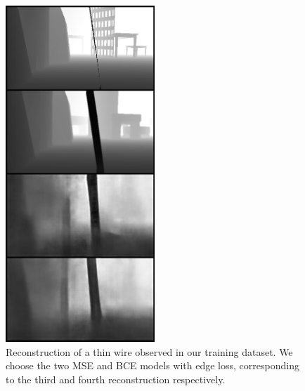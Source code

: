 \begin{figure}
    \centering
    \includegraphics[width=0.5\textwidth]{figures/8_/thin.jpg}
    \caption{Reconstruction of a thin wire observed in our training dataset. We choose the two MSE and BCE models with edge loss, corresponding to the third and fourth reconstruction respectively. }
    \label{fig:thin}
\end{figure}